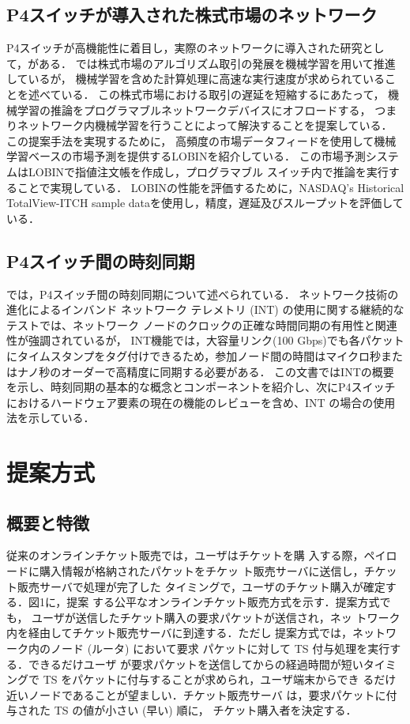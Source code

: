 \documentclass[a4j,11pt]{jreport}
\begin{document}
\section{P4スイッチが導入された株式市場のネットワーク}
P4スイッチが高機能性に着目し，実際のネットワークに導入された研究として，\cite{LOBIN}がある．
\cite{LOBIN}では株式市場のアルゴリズム取引の発展を機械学習を用いて推進しているが，
機械学習を含めた計算処理に高速な実行速度が求められていることを述べている．
この株式市場における取引の遅延を短縮するにあたって，
機械学習の推論をプログラマブルネットワークデバイスにオフロードする，
つまりネットワーク内機械学習を行うことによって解決することを提案している．
この提案手法を実現するために，
高頻度の市場データフィードを使用して機械学習ベースの市場予測を提供するLOBINを紹介している．
この市場予測システムはLOBINで指値注文帳を作成し，プログラマブル スイッチ内で推論を実行することで実現している．
LOBINの性能を評価するために，NASDAQ’s Historical TotalView-ITCH sample dataを使用し，精度，遅延及びスループットを評価している．

\section{P4スイッチ間の時刻同期}
\cite{Clock Synchronization}では，P4スイッチ間の時刻同期について述べられている．
ネットワーク技術の進化によるインバンド ネットワーク テレメトリ (INT) の使用に関する継続的なテストでは、ネットワーク ノードのクロックの正確な時間同期の有用性と関連性が強調されているが，
INT機能では，大容量リンク(100 Gbps)でも各パケットにタイムスタンプをタグ付けできるため，参加ノード間の時間はマイクロ秒またはナノ秒のオーダーで高精度に同期する必要がある．
この文書ではINTの概要を示し、時刻同期の基本的な概念とコンポーネントを紹介し、次にP4スイッチにおけるハードウェア要素の現在の機能のレビューを含め、INT の場合の使用法を示している．

\chapter{提案方式}

\section{概要と特徴}

従来のオンラインチケット販売では，ユーザはチケットを購
入する際，ペイロードに購入情報が格納されたパケットをチケッ
ト販売サーバに送信し，チケット販売サーバで処理が完了した
タイミングで，ユーザのチケット購入が確定する．図1に，提案
する公平なオンラインチケット販売方式を示す．提案方式でも，
ユーザが送信したチケット購入の要求パケットが送信され，ネッ
トワーク内を経由してチケット販売サーバに到達する．ただし
提案方式では，ネットワーク内のノード (ルータ) において要求
パケットに対して TS 付与処理を実行する．できるだけユーザ
が要求パケットを送信してからの経過時間が短いタイミングで
TS をパケットに付与することが求められ，ユーザ端末からでき
るだけ近いノードであることが望ましい．チケット販売サーバ
は，要求パケットに付与された TS の値が小さい (早い) 順に，
チケット購入者を決定する．
\end{document}
